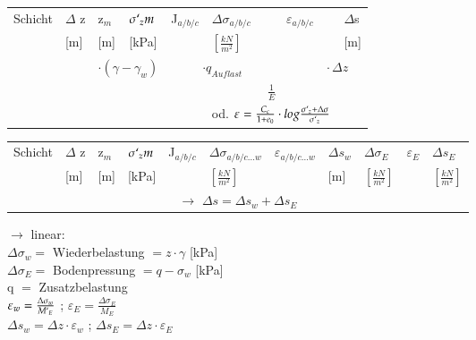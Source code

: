 	\begin{minipage}{\linewidth}
		\begin{tabular}{|l|l|l|l|l|l|l|l|}
		\hline
		Schicht	& $\Delta$ z	& z$_m$		& $\sigma`_zm$	& J$_{a/b/c}$	& $\Delta \sigma_{a/b/c}$ 	& $\varepsilon_{a/b/c}$ 	& $\Delta$s \\
				& [m]			& [m]		&  [kPa]		& 				& $\left[\frac{kN}{m^2}\right]$ &		& [m] \\ \hline
				
				&		& \multicolumn{2}{c|}{$\cdot (\gamma - \gamma_w)$} &		\multicolumn{2}{c|}{$\cdot q_{Auflast}$} & \multicolumn{2}{c|}{$\qquad \cdot \Delta z$} \\
				&	&	&	&	& \multicolumn{2}{c|}{$\frac{1}{E}$} & \\
				&	&	&	&	&\multicolumn{2}{c|}{ od. $\varepsilon=\frac{C_c}{1 + e_0} \cdot log \frac{\sigma`_z + \Delta \sigma}{\sigma`_z}$} & \\ \hline 	
		\end{tabular}
	\vspace{\baselineskip}
	
		\begin{tabular}{|l|l|l|l|l|l|l|l|l|l|l|}
				\hline
				Schicht	& $\Delta$ z	& z$_m$		& $\sigma`_zm$	& J$_{a/b/c}$	& $\Delta \sigma_{a/b/c...w}$ 	& $\varepsilon_{a/b/c...w}$ 	& $\Delta s_w$ & $\Delta \sigma_E$ & $\varepsilon_E$ & $\Delta s_E$	\\
				& [m]			& [m]		&  [kPa]		& 				& $\left[\frac{kN}{m^2}\right]$ &		& [m] 	& $\left[\frac{kN}{m^2}\right]$ &		 & $\left[\frac{kN}{m^2}\right]$ \\ \hline
				\multicolumn{11}{|c|}{$\rightarrow$ $\Delta s = \Delta s_w + \Delta s_E$} \\
		\end{tabular}
	
	\vspace{\baselineskip}
		
	$\rightarrow$ linear: \\
	$\Delta \sigma_w=$ Wiederbelastung $=z \cdot \gamma$ [kPa] \\
	$\Delta \sigma_E=$ Bodenpressung $=q - \sigma_w$ [kPa] \\
	q $=$ Zusatzbelastung \\
	$\varepsilon_w = \frac{\Delta \sigma_w}{M`_E}$ ; $\varepsilon_E = \frac{\Delta \sigma_E}{M_E}$ \\
	$\Delta s_w = \Delta z \cdot\varepsilon_w$ ; $\Delta s_E = \Delta z \cdot\varepsilon_E$\\
	

\end{minipage}
